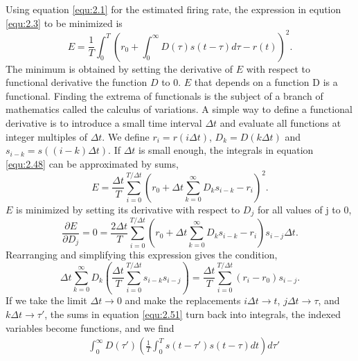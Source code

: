 \begin{solution}
  Using equation \ref{equ:2.1} for the estimated firing rate, the expression in eqution \ref{equ:2.3} to be minimized is
  \begin{equation}
    \label{equ:2.48}
    E = \frac{1}{T}\int_0^T\left(r_0 + \int_0^{\infty}D(\tau) s(t-\tau)d\tau - r(t)\right)^2.
  \end{equation}
  The minimum is obtained by setting the derivative of $E$ with respect to functional derivative the function $D$ to $0$. $E$ that depends on a function D is a functional. Finding the extrema of functionals is the subject of a branch of mathematics called the calculus of variations. A simple way to define a functional derivative is to introduce a small time interval $\Delta t$ and evaluate all functions at integer multiples of $\Delta t$. We define $r_i = r(i\Delta t)$, $D_k = D(k\Delta t)$ and $s_{i-k} = s((i-k)\Delta t)$. If $\Delta t$ is small enough, the integrals in equation \ref{equ:2.48} can be approximated by sums,
  \begin{equation}
    \label{equ:2.49}
    E = \frac{\Delta t}{T}\sum\limits_{i = 0}^{T/\Delta t}\left(r_0+\Delta t \sum\limits_{k = 0}^{\infty}D_ks_{i-k} - r_i\right)^2.
  \end{equation}
  $E$ is minimized by setting its derivative with respect to $D_j$ for all values of j to 0,
  \begin{equation}
    \label{equ:2.50}
    \frac{\partial E}{\partial D_j} = 0 = \frac{2\Delta t}{T}\sum\limits_{i=0}^{T/\Delta t}\left(r_0+\Delta t \sum\limits_{k = 0}^{\infty}D_ks_{i-k} - r_i\right)s_{i-j}\Delta t.
  \end{equation}
  Rearranging and simplifying this expression gives the condition,
  \begin{equation}
    \label{equ:2.51}
    \Delta t \sum\limits_{k = 0}^{\infty}D_k\left(\frac{\Delta t}{T}\sum\limits_{i=0}^{T/\Delta t}s_{i-k}s_{i-j}\right) =
    \frac{\Delta t}{T}\sum\limits_{i=0}^{T/\Delta t}(r_i-r_0)s_{i-j}.
  \end{equation}
  If we take the limit $\Delta t \to 0$ and make the replacements $i\Delta t \to t$, $j\Delta t \to \tau$, and $k\Delta t \to \tau'$, the sums in equation \ref{equ:2.51} turn back into integrals, the indexed variables become functions, and we find
  \begin{equation}
    \label{equ:2.52}
    \begin{aligned}
      &\int_0^{\infty}D(\tau')\left(\frac{1}{T}\int_0^{T}s(t-\tau')s(t-\tau)dt\right)d\tau'\\

\end{aligned}
\end{equation}
\end{solution}

